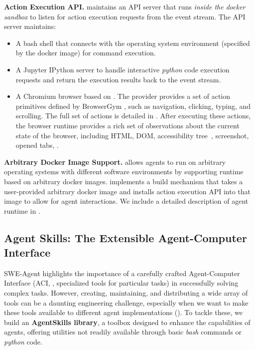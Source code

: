\noindent \textbf{\projname Action Execution API.} \projname maintains an API server that runs \textit{inside the docker sandbox} to listen for action execution requests from the event stream. The API server maintains:

\begin{itemize}[noitemsep,topsep=0pt,parsep=2pt,partopsep=0pt,leftmargin=18pt]
\item[(1)] A bash shell that connects with the operating system environment (specified by the docker image) for command execution.

\item[(2)] A Jupyter IPython server to handle interactive \emph{python} \citep{ipython} code execution requests and return the execution results back to the event stream.
\item[(3)] A Chromium browser based on \cite{playwright}. The provider provides a set of action primitives defined by BrowserGym \citep{browsergym, workarena2024}, such as navigation, clicking, typing, and scrolling. The full set of actions is detailed in . 
After executing these actions, the browser runtime provides a rich set of observations about the current state of the browser, including HTML, DOM, accessibility tree~\citep{accessibilitytree}, screenshot, opened tabs, \etc.
\end{itemize}

\noindent \textbf{Arbitrary Docker Image Support.} \projname allows agents to run on arbitrary operating systems with different software environments by supporting runtime based on arbitrary docker images.
\projname implements a build mechanism that takes a user-provided arbitrary docker image and installs \projname action execution API into that image to allow for agent interactions.
We include a detailed description of \projname agent runtime in .





\subsection{Agent Skills: The Extensible Agent-Computer Interface}
\label{sec:agent-skills}

SWE-Agent \citep{yang2024sweagent} highlights the importance of a carefully crafted Agent-Computer Interface (ACI, \ie, specialized tools for particular tasks) in successfully solving complex tasks.
However, creating, maintaining, and distributing a wide array of tools can be a daunting engineering challenge, especially when we want to make these tools available to different agent implementations ().
To tackle these, we build an \textbf{AgentSkills library}, a toolbox designed to enhance the capabilities of agents, offering utilities not readily available through basic \textit{bash} commands or \textit{python} code.

